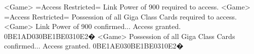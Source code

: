 <Game> =Access Restricted= Link Power of 900 required to access. 
<Game> =Access Restricted= Possession of all Giga Class Cards required to access. 
<Game> Link Power of 900 confirmed... Access granted. 
{0B}{E1}{AD}{03}{0B}{E1}{BE}{03}{10}{E2}�
<Game> Possession of all Giga Class Cards confirmed... Access granted. 
{0B}{E1}{AE}{03}{0B}{E1}{BE}{03}{10}{E2}�
